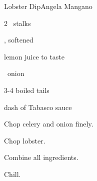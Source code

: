 \begin{recipe}{Lobster Dip}{Angela Mangano}{}

\begin{ingredients}
\item 2~ stalks
\item {} , softened
\item lemon juice to taste
\item \half~onion
\item 3-4 boiled  tails
\item dash of Tabasco sauce
\end{ingredients}

\begin{directions}
\item Chop celery and onion finely.
\item Chop lobster.
\item Combine all ingredients.
\item Chill.
\end{directions}

\end{recipe}
